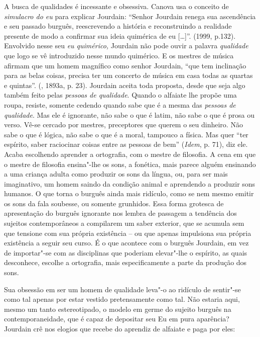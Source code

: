 A busca de qualidades é incessante e obsessiva. Canova usa o conceito de
\emph{simulacro do eu} para explicar Jourdain: ``Senhor Jourdain renega
sua ascendência e seu passado burguês, reescrevendo a história e
reconstruindo a realidade presente de modo a confirmar sua ideia
quimérica de eu [\ldots{}]''. (1999, p.132). Envolvido nesse seu
\emph{eu quimérico,} Jourdain não pode ouvir a palavra \emph{qualidade}
que logo se vê introduzido nesse mundo quimérico. E os mestres de música
afirmam que um homem magnífico como senhor Jourdain, ``que tem
inclinação para as belas coisas, precisa ter um concerto de música em
casa todas as quartas e quintas''. (, 1893a, p. 23). Jourdain aceita
toda proposta, desde que seja algo também feito pelas \emph{pessoas de
qualidade}. Quando o alfaiate lhe propõe uma roupa, resiste, somente
cedendo quando sabe que é a mesma das \emph{pessoas de qualidade}. Mas
ele é ignorante, não sabe o que é latim, não sabe o que é prosa ou
verso. Vê-se cercado por mestres, preceptores que querem o seu dinheiro.
Não sabe o que é lógica, não sabe o que é a moral, tampouco a física.
Mas quer ``ter espírito, saber raciocinar coisas entre as pessoas de
bem'' (\emph{Idem}, p. 71), diz ele. Acaba escolhendo aprender a
ortografia, com o mestre de filosofia. A cena em que o mestre de
filosofia ensina"-lhe os sons, a fonética, mais parece alguém ensinando a
uma criança adulta como produzir os sons da língua, ou, para ser mais
imaginativo, um homem saindo da condição animal e aprendendo a produzir
sons humanos. O que torna o burguês ainda mais ridículo, como se nem
mesmo emitir os sons da fala soubesse, ou somente grunhidos. Essa forma
grotesca de apresentação do burguês ignorante nos lembra de passagem a
tendência dos sujeitos contemporâneos a compilarem um saber exterior,
que se acumula sem que tensione com sua própria existência -- ou que
apenas impulsiona sua própria existência a seguir seu curso. É o que
acontece com o burguês Jourdain, em vez de importar"-se com as
disciplinas que poderiam elevar"-lhe o espírito, as quais desconhece,
escolhe a ortografia, mais especificamente a parte da produção dos sons.

Sua obsessão em ser um homem de qualidade leva"-o ao ridículo de
sentir"-se como tal apenas por estar vestido pretensamente como tal. Não
estaria aqui, mesmo um tanto estereotipado, o modelo em germe do sujeito
burguês na contemporaneidade, que é capaz de depositar seu Eu em pura
aparência? Jourdain crê nos elogios que recebe do aprendiz de alfaiate e
paga por eles:

